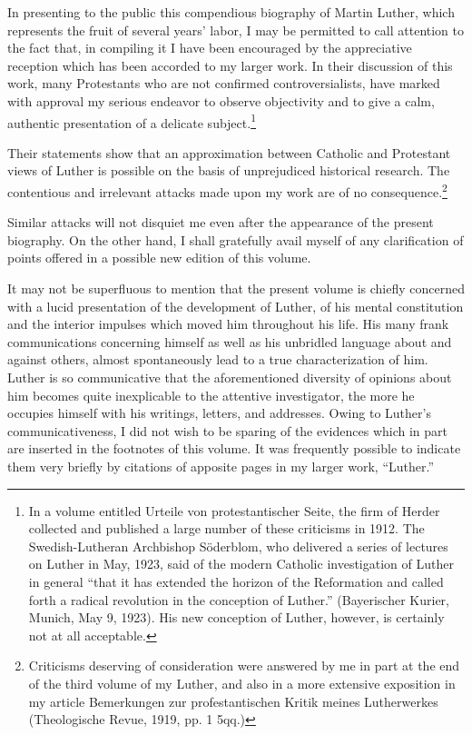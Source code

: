 In presenting to the public this compendious biography of Martin
Luther, which represents the fruit of several years’ labor, I may be
permitted to call attention to the fact that, in compiling it I have
been encouraged by the appreciative reception which has been accorded to my larger work.
In their discussion of this work, many
Protestants who are not confirmed controversialists, have marked
with approval my serious endeavor to observe objectivity and to give
a calm, authentic presentation of a delicate subject.\footnote{
In a volume entitled Urteile von protestantischer Seite, the firm of Herder collected and
published a large number of these criticisms in 1912. The Swedish-Lutheran Archbishop
Söderblom, who delivered a series of lectures on Luther in May, 1923, said of the modern
Catholic investigation of Luther in general “that it has extended the horizon of the Reformation and called forth a radical revolution in the conception of Luther.” (Bayerischer Kurier,
Munich, May 9, 1923). His new conception of Luther, however, is certainly not at all
acceptable.
}

Their statements show that an approximation between Catholic and Protestant
views of Luther is possible on the basis of unprejudiced historical research. The contentious and irrelevant attacks made upon my work
are of no consequence.\footnote{
Criticisms deserving of consideration were answered by me in part at the end of the
third volume of my Luther, and also in a more extensive exposition in my article Bemerkungen zur profestantischen Kritik meines Lutherwerkes (Theologische Revue, 1919, pp. 1 5qq.)
}

Similar attacks will not disquiet me even
after the appearance of the present biography. On the other hand,
I shall gratefully avail myself of any clarification of points offered in
a possible new edition of this volume.

It may not be superfluous to mention that the present volume is
chiefly concerned with a lucid presentation of the development of
Luther, of his mental constitution and the interior impulses which
moved him throughout his life. His many frank communications concerning himself as well as his unbridled language about and against
others, almost spontaneously lead to a true characterization of him.
Luther is so communicative that the aforementioned diversity of
opinions about him becomes quite inexplicable to the attentive investigator, the more he occupies himself with his writings, letters, and
addresses. Owing to Luther’s communicativeness, I did not wish to be
sparing of the evidences which in part are inserted in the footnotes
of this volume. It was frequently possible to indicate them very
briefly by citations of apposite pages in my larger work, “Luther.”

